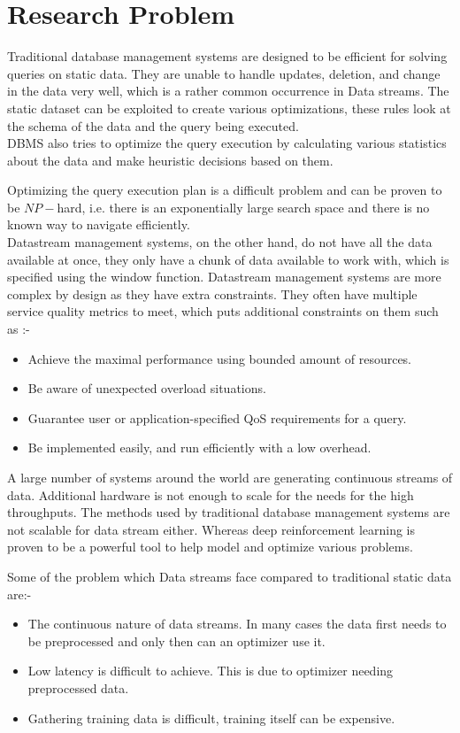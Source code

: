 \section{Research Problem}
\label{sec:Problem at hand}
Traditional database management systems are designed to be efficient for solving queries on static data. They are unable to handle updates, deletion, and change in the data very well, which is a rather common occurrence in Data streams. The static dataset can be exploited to create various optimizations, these rules look at the schema of the data and the query being executed.\\
DBMS also tries to optimize the query execution by calculating various statistics about the data and make heuristic decisions based on them.    
\par Optimizing the query execution plan is a difficult problem and can be proven to be $NP-$hard, i.e. there is an exponentially large search space and there is no known way to navigate efficiently.\\
Datastream management systems, on the other hand, do not have all the data available at once, they only have a chunk of data available to work with, which is specified using the window function. Datastream management systems are more complex by design as they have extra constraints. They often have multiple service quality metrics to meet, which puts additional constraints on them such as \cite{stream_optimization} :-
\begin{itemize}
    \item Achieve the maximal performance using bounded amount of resources.
    \item Be aware of unexpected overload situations.
    \item Guarantee user or application-specified QoS requirements for a query.
    \item Be implemented easily, and run efficiently with a low overhead.
\end{itemize}
\par A large number of systems around the world are generating continuous streams of data. Additional hardware is not enough to scale for the needs for the high throughputs. The methods used by traditional database management systems are not scalable for data stream either. Whereas deep reinforcement learning is proven to be a powerful tool to help model and optimize various problems.
\par Some of the problem which Data streams face compared to traditional static data are:-
\begin{itemize}
    \item The continuous nature of data streams. In many cases the data first needs to be preprocessed and only then can an optimizer use it.
    \item Low latency is difficult to achieve. This is due to optimizer needing preprocessed data.
    \item Gathering training data is difficult, training itself can be expensive.
\end{itemize}

